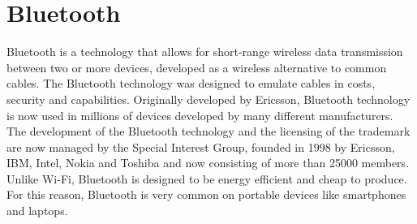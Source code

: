 \chapter{Bluetooth}
Bluetooth is a technology that allows for short-range wireless data transmission between two or more devices, developed as a wireless alternative to common cables. The Bluetooth technology was designed to emulate cables in costs, security and capabilities. \newline
Originally developed by Ericsson, Bluetooth technology is now used in millions of devices developed by many different manufacturers.
The development of the Bluetooth technology and the licensing of the trademark are now managed by the Special Interest Group, founded in 1998 by Ericsson, IBM, Intel, Nokia and Toshiba and now consisting of more than 25000 members.
Unlike Wi-Fi, Bluetooth is designed to be energy efficient and cheap to produce. For this reason, Bluetooth is very common on portable devices like smartphones and laptops.


